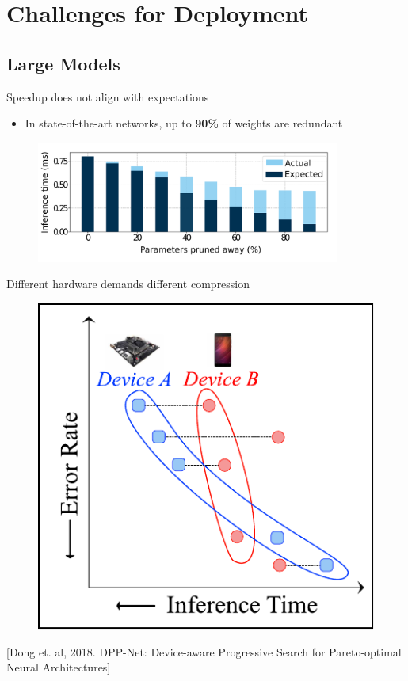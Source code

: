 \documentclass[xcolor=dvipsnames]{beamer}
\begin{document}


\section{Challenges for Deployment}

\subsection{Large Models}


\begin{frame}{Speedup does not align with expectations}

\begin{itemize}
	\item In state-of-the-art networks, up to \textbf{90\%} of weights are redundant
\end{itemize}

\begin{figure}
    \centering
    \includegraphics[width=10cm]{images/speedup.pdf}
\end{figure}



\end{frame}


\begin{frame}{Different hardware demands different compression}

\begin{figure}
    \centering
    \includegraphics[width=0.6\linewidth]{images/pareto_efficiency.pdf}
\end{figure}

[Dong et. al, 2018. DPP-Net: Device-aware Progressive Search for Pareto-optimal Neural Architectures]
\end{frame}
\end{document}
